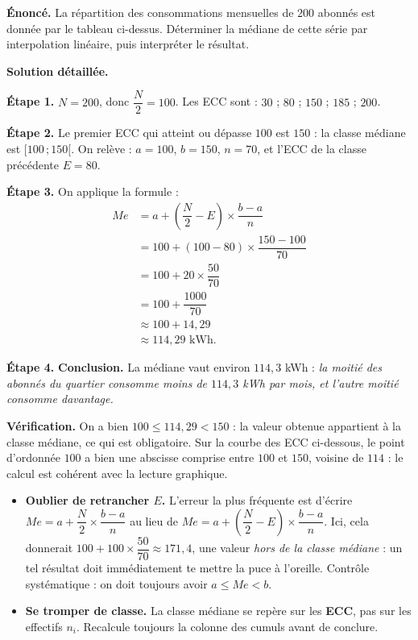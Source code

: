 \documentclass[11pt]{article}
\begin{document}
\begin{exoresolu}
\textbf{Énoncé.} La répartition des consommations mensuelles de $200$ abonnés est donnée par le tableau ci-dessus. Déterminer la médiane de cette série par interpolation linéaire, puis interpréter le résultat.

\tcblower
\textbf{Solution détaillée.}

\textbf{Étape 1.} $N = 200$, donc $\dfrac{N}{2} = 100$. Les ECC sont : $30$ ; $80$ ; $150$ ; $185$ ; $200$.

\textbf{Étape 2.} Le premier ECC qui atteint ou dépasse $100$ est $150$ : la classe médiane est $[100\,;150[$. On relève : $a = 100$, $b = 150$, $n = 70$, et l'ECC de la classe précédente $E = 80$.

\textbf{Étape 3.} On applique la formule :
\begin{align*}
Me &= a + \left(\dfrac{N}{2} - E\right) \times \dfrac{b-a}{n} \\
&= 100 + (100 - 80) \times \dfrac{150 - 100}{70} \\
&= 100 + 20 \times \dfrac{50}{70} \\
&= 100 + \dfrac{1000}{70} \\
&\approx 100 + 14{,}29 \\
&\approx 114{,}29 \text{ kWh}.
\end{align*}

\textbf{Étape 4.} \textbf{Conclusion.} La médiane vaut environ $114{,}3$ kWh : \emph{la moitié des abonnés du quartier consomme moins de $114{,}3$ kWh par mois, et l'autre moitié consomme davantage.}

\textbf{Vérification.} On a bien $100 \leq 114{,}29 < 150$ : la valeur obtenue appartient à la classe médiane, ce qui est obligatoire. Sur la courbe des ECC ci-dessous, le point d'ordonnée $100$ a bien une abscisse comprise entre $100$ et $150$, voisine de $114$ : le calcul est cohérent avec la lecture graphique.
\end{exoresolu}

\begin{attention}
\begin{itemize}
\item \textbf{Oublier de retrancher $E$.} L'erreur la plus fréquente est d'écrire $Me = a + \dfrac{N}{2} \times \dfrac{b-a}{n}$ au lieu de $Me = a + \left(\dfrac{N}{2} - E\right) \times \dfrac{b-a}{n}$. Ici, cela donnerait $100 + 100 \times \dfrac{50}{70} \approx 171{,}4$, une valeur \emph{hors de la classe médiane} : un tel résultat doit immédiatement te mettre la puce à l'oreille. Contrôle systématique : on doit toujours avoir $a \leq Me < b$.
\item \textbf{Se tromper de classe.} La classe médiane se repère sur les \textbf{ECC}, pas sur les effectifs $n_i$. Recalcule toujours la colonne des cumuls avant de conclure.
\end{itemize}
\end{attention}
\end{document}
